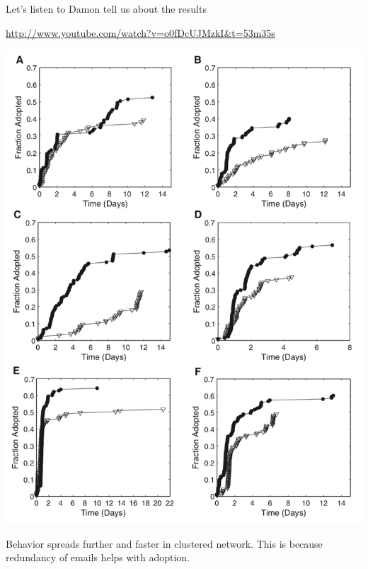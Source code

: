 \documentclass[aspectratio=169]{beamer}
\begin{document}
\begin{frame}

Let's listen to Damon tell us about the results

\url{http://www.youtube.com/watch?v=o0fDcUJMzkI&t=53m35s}

\end{frame}
\begin{frame}

\begin{center}
\includegraphics[height=0.8\textheight]{figures/centola_spread_2010_fig2}
\end{center}

\vfill
Behavior spreads further and faster in clustered network. This is because redundancy of emails helps with adoption.

\end{frame}
\end{document}
